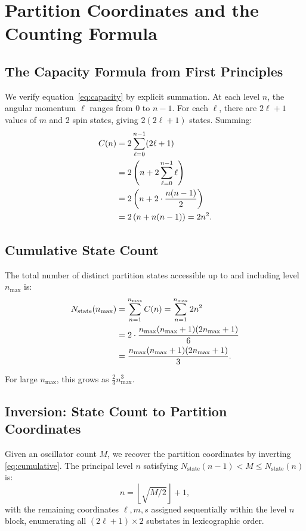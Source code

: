 \documentclass[twocolumn,10pt]{article}
\newcommand{\Nstate}{N_{\mathrm{state}}}
\begin{document}
\section{Partition Coordinates and the Counting Formula}
\label{sec:partition}

\subsection{The Capacity Formula from First Principles}

We verify equation~\eqref{eq:capacity} by explicit summation. At each level $n$, the angular momentum $\ell$ ranges from $0$ to $n-1$. For each $\ell$, there are $2\ell+1$ values of $m$ and 2 spin states, giving $2(2\ell+1)$ states. Summing:
\begin{align}
    C(n) &= 2\sum_{\ell=0}^{n-1}(2\ell+1) \notag\\
    &= 2\left(n + 2\sum_{\ell=0}^{n-1}\ell\right) \notag\\
    &= 2\left(n + 2\cdot\frac{n(n-1)}{2}\right) \notag\\
    &= 2\left(n + n(n-1)\right) = 2n^2.
\end{align}

\subsection{Cumulative State Count}

The total number of distinct partition states accessible up to and including level $n_{\max}$ is:
\begin{align}
    \Nstate(n_{\max}) &= \sum_{n=1}^{n_{\max}} C(n) = \sum_{n=1}^{n_{\max}} 2n^2 \notag\\
    &= 2 \cdot \frac{n_{\max}(n_{\max}+1)(2n_{\max}+1)}{6} \notag\\
    &= \frac{n_{\max}(n_{\max}+1)(2n_{\max}+1)}{3}.
    \label{eq:cumulative}
\end{align}

For large $n_{\max}$, this grows as $\frac{2}{3}n_{\max}^3$.

\subsection{Inversion: State Count to Partition Coordinates}

Given an oscillator count $M$, we recover the partition coordinates by inverting \eqref{eq:cumulative}. The principal level $n$ satisfying $\Nstate(n-1) < M \leq \Nstate(n)$ is:
\begin{equation}
    n = \left\lfloor \sqrt{M/2} \right\rfloor + 1,
    \label{eq:inversion}
\end{equation}
with the remaining coordinates $\ell, m, s$ assigned sequentially within the level $n$ block, enumerating all $(2\ell+1)\times 2$ substates in lexicographic order.
\end{document}
